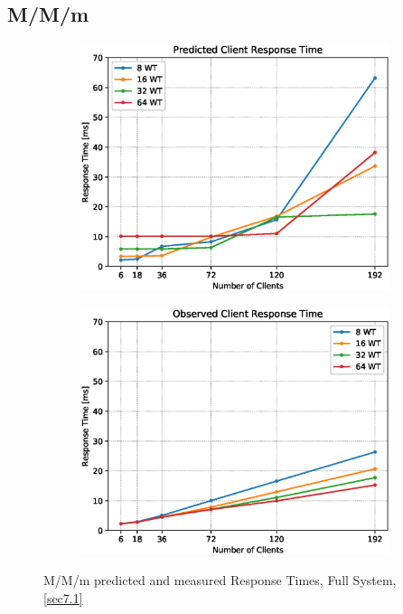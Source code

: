 \documentclass[11pt,a4paper]{article}
\begin{document}
\subsection{M/M/m}



\begin{figure}
    \begin{subfigure}{.5\textwidth}
        \includegraphics[width=1\linewidth]{plots/7_MMm_ResponseTimePredicted.eps}
    \end{subfigure}
    \begin{subfigure}{.5\textwidth}
        \includegraphics[width=1\linewidth]{plots/7_MMm_ResponseTimeObserved.eps}
    \end{subfigure}
    \caption{M/M/m predicted and measured Response Times, Full System, \autoref{sec7.1}}
    \label{fig:mmm-RT}
\end{figure}
\end{document}

